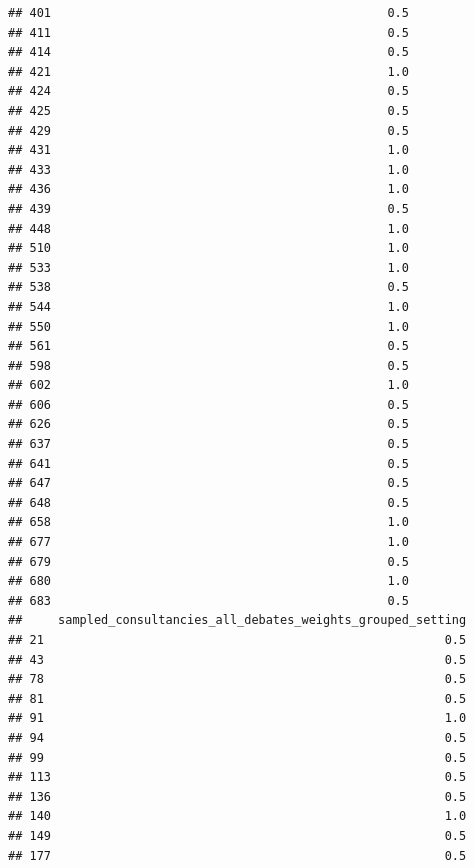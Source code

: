 \documentclass[
]{article}
\begin{document}
\begin{verbatim}
## 401                                               0.5
## 411                                               0.5
## 414                                               0.5
## 421                                               1.0
## 424                                               0.5
## 425                                               0.5
## 429                                               0.5
## 431                                               1.0
## 433                                               1.0
## 436                                               1.0
## 439                                               0.5
## 448                                               1.0
## 510                                               1.0
## 533                                               1.0
## 538                                               0.5
## 544                                               1.0
## 550                                               1.0
## 561                                               0.5
## 598                                               0.5
## 602                                               1.0
## 606                                               0.5
## 626                                               0.5
## 637                                               0.5
## 641                                               0.5
## 647                                               0.5
## 648                                               0.5
## 658                                               1.0
## 677                                               1.0
## 679                                               0.5
## 680                                               1.0
## 683                                               0.5
##     sampled_consultancies_all_debates_weights_grouped_setting
## 21                                                        0.5
## 43                                                        0.5
## 78                                                        0.5
## 81                                                        0.5
## 91                                                        1.0
## 94                                                        0.5
## 99                                                        0.5
## 113                                                       0.5
## 136                                                       0.5
## 140                                                       1.0
## 149                                                       0.5
## 177                                                       0.5

\end{verbatim}
\end{document}
